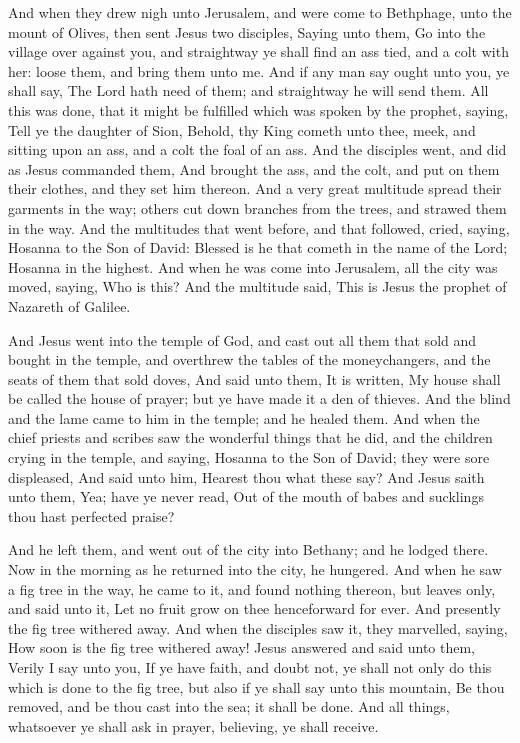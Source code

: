  And when they drew nigh unto Jerusalem, and were come to
Bethphage, unto the mount of Olives, then sent Jesus two disciples,
 Saying unto them, Go into the village over against you, and
straightway ye shall find an ass tied, and a colt with her: loose them,
and bring them unto me.  And if any man say ought unto you,
ye shall say, The Lord hath need of them; and straightway he will send
them.  All this was done, that it might be fulfilled which
was spoken by the prophet, saying,  Tell ye the daughter of
Sion, Behold, thy King cometh unto thee, meek, and sitting upon an ass,
and a colt the foal of an ass.  And the disciples went, and
did as Jesus commanded them,  And brought the ass, and the
colt, and put on them their clothes, and they set him thereon.
 And a very great multitude spread their garments in the
way; others cut down branches from the trees, and strawed them in the
way.  And the multitudes that went before, and that
followed, cried, saying, Hosanna to the Son of David: Blessed is he that
cometh in the name of the Lord; Hosanna in the highest. 
And when he was come into Jerusalem, all the city was moved, saying, Who
is this?  And the multitude said, This is Jesus the prophet
of Nazareth of Galilee.

 And Jesus went into the temple of God, and cast out all
them that sold and bought in the temple, and overthrew the tables of the
moneychangers, and the seats of them that sold doves,  And
said unto them, It is written, My house shall be called the house of
prayer; but ye have made it a den of thieves.  And the
blind and the lame came to him in the temple; and he healed them.
 And when the chief priests and scribes saw the wonderful
things that he did, and the children crying in the temple, and saying,
Hosanna to the Son of David; they were sore displeased, 
And said unto him, Hearest thou what these say? And Jesus saith unto
them, Yea; have ye never read, Out of the mouth of babes and sucklings
thou hast perfected praise?

 And he left them, and went out of the city into Bethany;
and he lodged there.  Now in the morning as he returned
into the city, he hungered.  And when he saw a fig tree in
the way, he came to it, and found nothing thereon, but leaves only, and
said unto it, Let no fruit grow on thee henceforward for ever. And
presently the fig tree withered away.  And when the
disciples saw it, they marvelled, saying, How soon is the fig tree
withered away!  Jesus answered and said unto them, Verily I
say unto you, If ye have faith, and doubt not, ye shall not only do this
which is done to the fig tree, but also if ye shall say unto this
mountain, Be thou removed, and be thou cast into the sea; it shall be
done.  And all things, whatsoever ye shall ask in prayer,
believing, ye shall receive.

